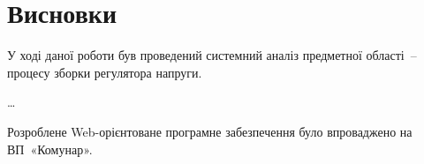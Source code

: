 \section*{Висновки}

У ході даної роботи був проведений системний аналіз предметної області~-- 
процесу зборки регулятора напруги. 

\ldots 

Розроблене Web-орієнтоване програмне забезпечення було впроваджено на ВП~«Комунар».